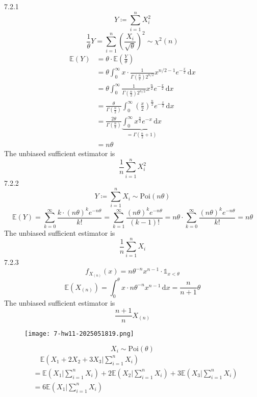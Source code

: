 7.2.1
\[
Y\coloneqq \sum_{i=1}^{n} X_i^2
\]
\[
\frac{1}{\theta}Y=\sum_{i=1}^{n} \left( \frac{X_i}{\sqrt{ \theta }} \right)^2\sim \chi^{2}(n)
\]
\[
\begin{aligned}
\mathbb{E}(Y) & =\theta \cdot\mathbb{E}\left( \frac{Y}{\theta} \right) \\
 & =\theta \int_{0}^{\infty}x\cdot \frac{1}{\Gamma\left( \frac{n}{2} \right)2^{n/2 }}x^{n/2-1 }e^{ -\frac{x}{2} } \, \mathrm{d}x  \\
 & =\theta \int_{0}^{\infty} \frac{1}{\Gamma\left( \frac{n}{2} \right)2^{n/2 }}x^{\frac{n}{2} }e^{ -\frac{x}{2} } \, \mathrm{d}x \\
 & =\frac{\theta}{\Gamma\left( \frac{n}{2} \right)}\int_{0}^{\infty} \left( \frac{x}{2} \right)^{\frac{n}{2}}e^{ -\frac{x}{2} } \, \mathrm{d}x  \\
 & =\frac{2\theta}{\Gamma\left( \frac{n}{2} \right)} \underbrace{ \int_{0}^{\infty} x^{\frac{n}{2}}e^{ -x } \, \mathrm{d}x }_{ =\Gamma\left( \frac{n}{2}+1 \right) }  \\
 & =n\theta
\end{aligned}
\]
The unbiased sufficient estimator is
\[
\frac{1}{n}\sum_{i=1}^{n} X_i^2
\]
7.2.2
\[
Y\coloneqq \sum_{i=1}^{n} X_i\sim \text{Poi}(n\theta)
\]
\[
\mathbb{E}(Y)=\sum_{k=0}^{\infty} \frac{k\cdot(n\theta)^{k}e^{ -n\theta }}{k!}=\sum_{k=1}^{\infty} \frac{(n\theta)^{k}e^{ -n\theta }}{(k-1)!}=n\theta \cdot \sum_{k=0}^{\infty } \frac{(n\theta)^{k}e^{ -n\theta }}{k!}=n\theta
\]
The unbiased sufficient estimator is
\[
\frac{1}{n}\sum_{i=1}^{n} X_i
\]
7.2.3
\[
f_{X_{(n)}}(x)=n\theta^{-n}x^{n-1}\cdot \mathbb{1}_{x<\theta}
\]
\[
\mathbb{E}(X_{(n)})=\int_{0}^{\theta} x\cdot n\theta^{-n}x^{n-1} \, \mathrm{d}x =\frac{n}{n+1}\theta
\]
The unbiased sufficient estimator is
\[
\frac{n+1}{n}X_{(n)}
\]
\begin{exercise}
\begin{figure}[H]
\centering
\texttt{[image: 7-hw11-2025051819.png]}
\label{}
\end{figure}
\end{exercise}
\[
X_i\sim \text{Poi}(\theta)
\]
\[
\begin{aligned}
 & \quad  \mathbb{E}\left( X_1+2X_2+3X_3|\sum_{i=1}^{n}X_i  \right) \\
 & =\mathbb{E}\left( X_1|\sum_{i=1}^{n} X_i \right)+2\mathbb{E}\left( X_2|\sum_{i=1}^{n} X_i \right)+3\mathbb{E}\left( X_3|\sum_{i=1}^{n} X_i \right) \\
 & =6\mathbb{E}\left( X_1|\sum_{i=1}^{n} X_i \right) 
\end{aligned}
\]
